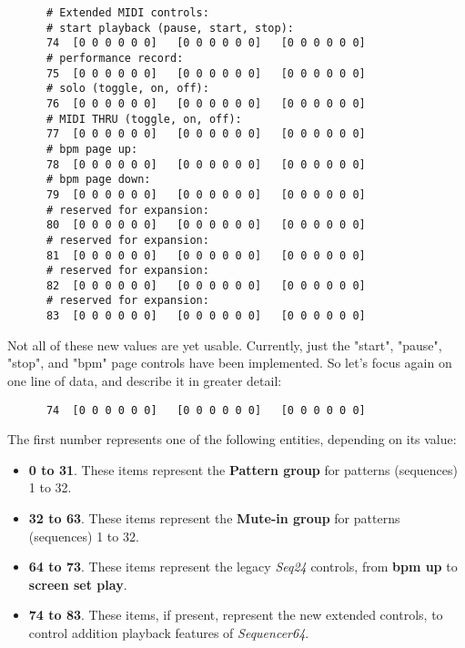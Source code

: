    \begin{verbatim}
      # Extended MIDI controls:
      # start playback (pause, start, stop):
      74  [0 0 0 0 0 0]   [0 0 0 0 0 0]   [0 0 0 0 0 0]
      # performance record:
      75  [0 0 0 0 0 0]   [0 0 0 0 0 0]   [0 0 0 0 0 0]
      # solo (toggle, on, off):
      76  [0 0 0 0 0 0]   [0 0 0 0 0 0]   [0 0 0 0 0 0]
      # MIDI THRU (toggle, on, off):
      77  [0 0 0 0 0 0]   [0 0 0 0 0 0]   [0 0 0 0 0 0]
      # bpm page up:
      78  [0 0 0 0 0 0]   [0 0 0 0 0 0]   [0 0 0 0 0 0]
      # bpm page down:
      79  [0 0 0 0 0 0]   [0 0 0 0 0 0]   [0 0 0 0 0 0]
      # reserved for expansion:
      80  [0 0 0 0 0 0]   [0 0 0 0 0 0]   [0 0 0 0 0 0]
      # reserved for expansion:
      81  [0 0 0 0 0 0]   [0 0 0 0 0 0]   [0 0 0 0 0 0]
      # reserved for expansion:
      82  [0 0 0 0 0 0]   [0 0 0 0 0 0]   [0 0 0 0 0 0]
      # reserved for expansion:
      83  [0 0 0 0 0 0]   [0 0 0 0 0 0]   [0 0 0 0 0 0]
   \end{verbatim}

   Not all of these new values are yet usable.  Currently, just the
   "start", "pause", "stop", and "bpm" page controls have been implemented.
   So let's focus again on one line of data, and describe it in greater detail:

   \begin{verbatim}
      74  [0 0 0 0 0 0]   [0 0 0 0 0 0]   [0 0 0 0 0 0]
   \end{verbatim}

   The first number represents one of the following entities, depending on its
   value:

   \begin{itemize}
      \item \textbf{0 to 31}.  These items represent the \textbf{Pattern group}
         for patterns (sequences) 1 to 32.
      \item \textbf{32 to 63}.  These items represent the \textbf{Mute-in
         group} for patterns (sequences) 1 to 32.
      \item \textbf{64 to 73}.  These items represent the legacy \textsl{Seq24}
         controls, from \textbf{bpm up} to \textbf{screen set play}.
      \item \textbf{74 to 83}.  These items, if present, represent the
         new extended controls, to control addition playback features of
         \textsl{Sequencer64}.
   \end{itemize}
   
